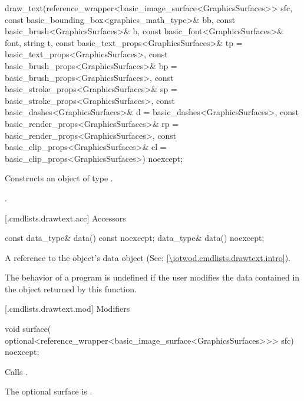 %
\begin{itemdecl}
draw_text(reference_wrapper<basic_image_surface<GraphicsSurfaces>> sfc, 
  const basic_bounding_box<graphics_math_type>& bb,
  const basic_brush<GraphicsSurfaces>& b,
  const basic_font<GraphicsSurfaces>& font, string t,
  const basic_text_props<GraphicsSurfaces>& tp = 
  basic_text_props<GraphicsSurfaces>{},
  const basic_brush_props<GraphicsSurfaces>& bp = 
  basic_brush_props<GraphicsSurfaces>{},
  const basic_stroke_props<GraphicsSurfaces>& sp = 
  basic_stroke_props<GraphicsSurfaces>{},
  const basic_dashes<GraphicsSurfaces>& d = 
  basic_dashes<GraphicsSurfaces>{},
  const basic_render_props<GraphicsSurfaces>& rp = 
  basic_render_props<GraphicsSurfaces>{},
  const basic_clip_props<GraphicsSurfaces>& cl = 
  basic_clip_props<GraphicsSurfaces>{}) noexcept;
\end{itemdecl}
\begin{itemdescr}
\pnum
\effects Constructs an object of type .

\pnum
\postconditions {}.
\end{itemdescr}

 [\iotwod.cmdlists.drawtext.acc] {Accessors}%

%
\begin{itemdecl}
const data_type& data() const noexcept;
data_type& data() noexcept;
\end{itemdecl}
\begin{itemdescr}
\pnum
\returns A reference to the  object's data object (See: \ref{\iotwod.cmdlists.drawtext.intro}).

\pnum
\remarks The behavior of a program is undefined if the user modifies the data contained in the  object returned by this function.
\end{itemdescr}

 [\iotwod.cmdlists.drawtext.mod] {Modifiers}%

%
\begin{itemdecl}
void surface(
  optional<reference_wrapper<basic_image_surface<GraphicsSurfaces>>> sfc) 
  noexcept;
\end{itemdecl}
\begin{itemdescr}
\pnum
\effects Calls .

\pnum
\remarks The optional surface is .
\end{itemdescr}

